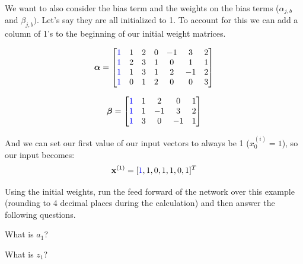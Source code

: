 \documentclass[11pt,addpoints,answers]{exam}
\newcommand{\xv}{\mathbf{x}}
\begin{document}
\begin{questions}
\begin{parts}
We want to also consider the bias term and the weights on the bias terms (${\alpha}_{j,b}$ and ${\beta}_{j,b})$. Let's say they are all initialized to 1. To account for this we can add a column of 1's to the beginning of our initial weight matrices. 

$$\boldsymbol{\alpha}=
    \begin{bmatrix}
    \textcolor{blue}{1} & 1 & 2 & 0 & -1 & 3 & 2\\
    \textcolor{blue}{1} & 2 & 3 & 1 & 0 & 1 & 1 \\
    \textcolor{blue}{1} & 1 & 3 & 1 & 2 & -1 & 2 \\
    \textcolor{blue}{1} & 0 & 1 & 2 & 0 & 0 & 3
    \end{bmatrix}$$
    
$$\boldsymbol{\beta}=
    \begin{bmatrix}
    \textcolor{blue}{1} & 1 & 2 & 0 & 1 \\
    \textcolor{blue}{1} & 1 & -1 & 3 & 2 \\
    \textcolor{blue}{1} & 3 & 0 & -1 & 1
    \end{bmatrix}
$$

And we can set our first value of our input vectors to always be 1 ($x_0^{(i)} = 1$), so our input becomes: $$\xv^{(1)}=[\textcolor{blue}{1},1,0,1,1,0,1]^T$$

 Using the initial weights, run the feed forward of the network over this example (rounding to 4 decimal places during the calculation) and then answer the following questions. 
 
\clearpage
\begin{subparts}
    \subpart[1] What is $a_1$?

    \begin{your_solution}[title=$a_1$,height=2cm,width=3cm]
    \end{your_solution}
    \begin{your_solution}[title=Work,height=4cm,width=12cm]
    \end{your_solution}


    
    \subpart[1] What is $z_1$?
    

\end{subparts}
\end{parts}
\end{questions}
\end{document}
